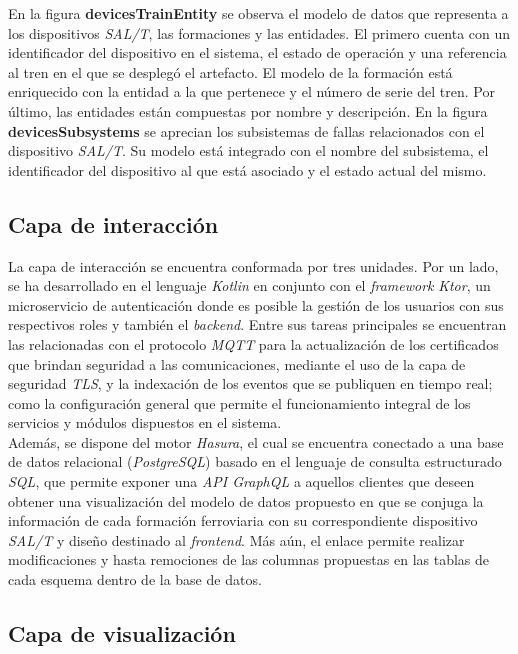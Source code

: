 En la figura \textbf{devicesTrainEntity} se observa el modelo de datos que representa a los dispositivos \textit{SAL/T}, las formaciones y las entidades. 
El primero cuenta con un identificador del dispositivo en el sistema, el estado de operación y una referencia al tren en el que se desplegó el artefacto. 
El modelo de la formación está enriquecido con la entidad a la que pertenece y el número de serie del tren. 
Por último, las entidades están compuestas por nombre y descripción.
En la figura \textbf{devicesSubsystems} se aprecian los subsistemas de fallas relacionados con el dispositivo \textit{SAL/T}. Su modelo está integrado con el nombre del subsistema, el identificador del dispositivo al que está asociado y el estado actual del mismo. 


\subsection{Capa de interacción}

La capa de interacción se encuentra conformada por tres unidades. Por un lado, se ha desarrollado en el lenguaje \textit{Kotlin} en conjunto con el \textit{framework} \textit{Ktor}, un microservicio de autenticación donde es posible la gestión de los usuarios con sus respectivos roles y también el \textit{backend}. Entre sus tareas principales se encuentran las relacionadas con el protocolo \textit{MQTT} para la actualización de los certificados que brindan seguridad a las comunicaciones, mediante el uso de la capa de seguridad \textit{TLS}, y la indexación de los eventos que se publiquen en tiempo real; como la configuración general que permite el funcionamiento integral de los servicios y módulos dispuestos en el sistema. \\

Además, se dispone del motor \textit{Hasura}, el cual se encuentra conectado a una base de datos relacional (\textit{PostgreSQL}) basado en el lenguaje de consulta estructurado \textit{SQL}, que permite exponer una \textit{API GraphQL} a aquellos clientes que deseen obtener una visualización del modelo de datos propuesto en que se conjuga la información de cada formación ferroviaria con su correspondiente dispositivo \textit{SAL/T} y diseño destinado al \textit{frontend}. Más aún, el enlace permite realizar modificaciones y hasta remociones de las columnas propuestas en las tablas de cada esquema dentro de la base de datos.


\subsection{Capa de visualización}

